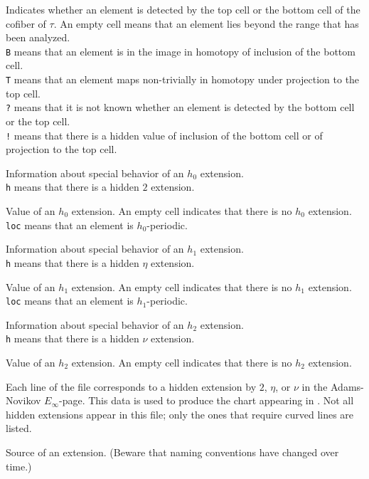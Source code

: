 \documentclass{amsart}
\begin{document}
 Indicates whether an element is detected by the top cell
or the bottom cell of the cofiber of $\tau$. An empty cell means that
an element lies beyond the range that has been analyzed. \\
\texttt{B} means that an element is in the image in homotopy 
of inclusion of the bottom cell.\\
\texttt{T} means that an element maps non-trivially in homotopy
under projection to the top cell. \\
\texttt{?} means that it is not known whether an element is detected
by the bottom cell or the top cell. \\
\texttt{!} means that there is a hidden value of inclusion of the 
bottom cell or of projection to the top cell.

Information about special behavior of an $h_0$ extension. \\
\texttt{h} means that there is a hidden $2$ extension.

Value of an $h_0$ extension.  An empty cell indicates
that there is no $h_0$ extension. \\
\texttt{loc} means that an element is $h_0$-periodic.

Information about special behavior of an $h_1$ extension. \\
\texttt{h} means that there is a hidden $\eta$ extension.

Value of an $h_1$ extension.  An empty cell indicates
that there is no $h_1$ extension. \\
\texttt{loc} means that an element is $h_1$-periodic.

Information about special behavior of an $h_2$ extension. \\
\texttt{h} means that there is a hidden $\nu$ extension.

Value of an $h_2$ extension.  An empty cell indicates
that there is no $h_2$ extension.

\newpage

Each line of the file corresponds to a hidden extension by
$2$, $\eta$, or $\nu$
in the Adams-Novikov $E_\infty$-page.  This data is used to produce the
chart appearing in \cite{IWX19a}.  Not all hidden extensions appear
in this file; only the ones that require curved lines are listed.

  Source of an extension.
(Beware that naming conventions have changed over time.)
\end{document}
